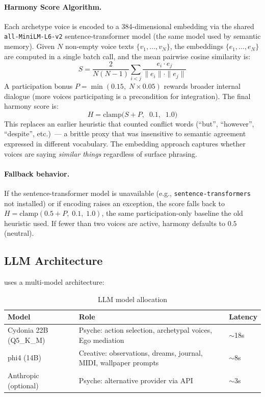 \documentclass[11pt,oneside]{article}
\begin{document}
\paragraph{Harmony Score Algorithm.}
Each archetype voice is encoded to a 384-dimensional embedding via the shared \texttt{all-MiniLM-L6-v2} sentence-transformer model (the same model used by semantic memory).
Given $N$ non-empty voice texts $\{v_1, \ldots, v_N\}$, the embeddings $\{e_1, \ldots, e_N\}$ are computed in a single batch call, and the mean pairwise cosine similarity is:
\[
S = \frac{2}{N(N-1)} \sum_{i < j} \frac{e_i \cdot e_j}{\|e_i\| \cdot \|e_j\|}
\]
A participation bonus $P = \min(0.15,\; N \times 0.05)$ rewards broader internal dialogue (more voices participating is a precondition for integration).
The final harmony score is:
\[
H = \text{clamp}\!\Big(S + P,\;\; 0.1,\;\; 1.0\Big)
\]
This replaces an earlier heuristic that counted conflict words (``but'', ``however'', ``despite'', etc.)\ --- a brittle proxy that was insensitive to semantic agreement expressed in different vocabulary.
The embedding approach captures whether voices are saying \emph{similar things} regardless of surface phrasing.

\paragraph{Fallback behavior.}
If the sentence-transformer model is unavailable (e.g., \texttt{sentence-transformers} not installed) or if encoding raises an exception, the score falls back to $H = \text{clamp}(0.5 + P,\; 0.1,\; 1.0)$, the same participation-only baseline the old heuristic used.
If fewer than two voices are active, harmony defaults to $0.5$ (neutral).

\subsection{LLM Architecture}
\label{sec:llm}

\sociopsi{} uses a multi-model architecture:

\begin{table}[H]
\centering
\caption{LLM model allocation}
\label{tab:models}
\small
\begin{tabular}{l l l}
\toprule
\textbf{Model} & \textbf{Role} & \textbf{Latency} \\
\midrule
Cydonia 22B (Q5\_K\_M)     & Psyche: action selection, archetypal voices, Ego mediation & $\sim$18s \\
phi4 (14B)                & Creative: observations, dreams, journal, MIDI, wallpaper prompts & $\sim$8s \\
Anthropic (optional)      & Psyche: alternative provider via API & $\sim$3s \\
\bottomrule
\end{tabular}
\end{table}
\end{document}
